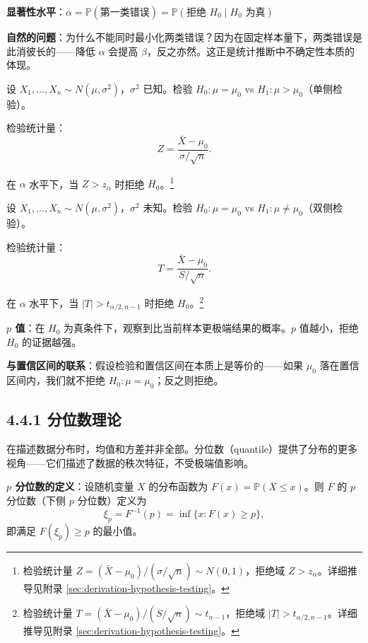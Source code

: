 \textbf{显著性水平}：$\alpha = \mathbb{P}(\text{第一类错误}) = \mathbb{P}(\text{拒绝 } H_0 \mid H_0 \text{ 为真})$

\textbf{自然的问题}：为什么不能同时最小化两类错误？因为在固定样本量下，两类错误是此消彼长的——降低 $\alpha$ 会提高 $\beta$，反之亦然。这正是统计推断中不确定性本质的体现。

\begin{example}\label{ex:test-normal-known}
设 $X_1, \ldots, X_n \sim N(\mu, \sigma^2)$，$\sigma^2$ 已知。检验 $H_0: \mu = \mu_0$ vs $H_1: \mu > \mu_0$（单侧检验）。

检验统计量：
\[
Z = \frac{\bar{X} - \mu_0}{\sigma/\sqrt{n}}.
\label{eq:z-test-statistic}\]

在 $\alpha$ 水平下，当 $Z > z_\alpha$ 时拒绝 $H_0$。\footnote{检验统计量 $Z = (\bar{X}-\mu_0)/(\sigma/\sqrt{n}) \sim N(0,1)$，拒绝域 $Z > z_\alpha$。详细推导见附录 \cref{sec:derivation-hypothesis-testing}。}
\end{example}

\begin{example}\label{ex:test-normal-unknown}
设 $X_1, \ldots, X_n \sim N(\mu, \sigma^2)$，$\sigma^2$ 未知。检验 $H_0: \mu = \mu_0$ vs $H_1: \mu \neq \mu_0$（双侧检验）。

检验统计量：
\[
T = \frac{\bar{X} - \mu_0}{S/\sqrt{n}}.
\label{eq:t-test-statistic}\]

在 $\alpha$ 水平下，当 $|T| > t_{\alpha/2,n-1}$ 时拒绝 $H_0$。\footnote{检验统计量 $T = (\bar{X}-\mu_0)/(S/\sqrt{n}) \sim t_{n-1}$，拒绝域 $|T| > t_{\alpha/2,n-1}$。详细推导见附录 \cref{sec:derivation-hypothesis-testing}。}
\end{example}

\textbf{$p$ 值}：在 $H_0$ 为真条件下，观察到比当前样本更极端结果的概率。$p$ 值越小，拒绝 $H_0$ 的证据越强。

\textbf{与置信区间的联系}：假设检验和置信区间在本质上是等价的——如果 $\mu_0$ 落在置信区间内，我们就不拒绝 $H_0: \mu = \mu_0$；反之则拒绝。

\subsection{4.4.1 分位数理论}\label{sec:4.4.1}

在描述数据分布时，均值和方差并非全部。分位数（quantile）提供了分布的更多视角——它们描述了数据的秩次特征，不受极端值影响。

\textbf{$p$ 分位数的定义}：设随机变量 $X$ 的分布函数为 $F(x) = \mathbb{P}(X \leq x)$。则 $F$ 的 $p$ 分位数（下侧 $p$ 分位数）定义为
\[
\xi_p = F^{-1}(p) = \inf\{x : F(x) \geq p\},
\label{eq:quantile-definition}
\]
即满足 $F(\xi_p) \geq p$ 的最小值。

